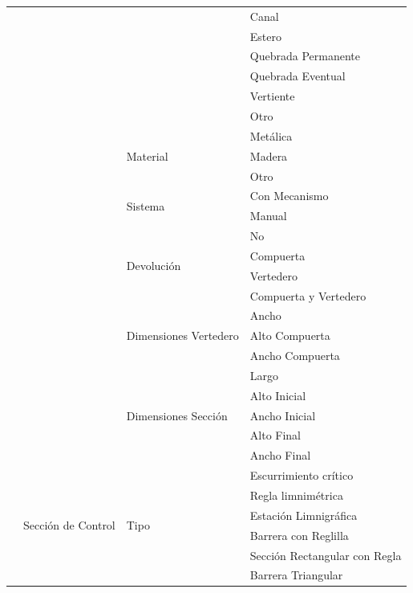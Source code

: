 \documentclass[]{article}
\begin{document}
\begin{longtable}{|p{3cm}|p{3.5cm}|p{3.5cm}|p{3.5cm}|}
    \cline{4-4}
    & & & Canal\\
    \cline{4-4}
    & & & Estero\\
    \cline{4-4}
    & & & Quebrada Permanente\\
    \cline{4-4}
    & & & Quebrada Eventual\\
    \cline{4-4}
    & & & Vertiente\\
    \cline{4-4}
    & & & Otro\\
    \cline{3-4}
    & & \multirow {3}{3.5cm}{Material} & Metálica\\
    \cline{4-4}
    & & & Madera\\
    \cline{4-4}
    & & & Otro\\
    \cline{3-4}
    & & \multirow {2}{3.5cm}{Sistema} & Con Mecanismo\\
    \cline{4-4}
    & & & Manual\\
    \cline{3-4}
    & & \multirow {4}{3.5cm}{Devolución} & No\\
    \cline{4-4}
    & & & Compuerta\\
    \cline{4-4}
    & & & Vertedero\\
    \cline{4-4}
    & & & Compuerta y Vertedero\\
    \cline{3-4}
    & & \multirow {3}{3.5cm}{Dimensiones Vertedero} & Ancho\\
    \cline{4-4}
    & & & Alto Compuerta\\
    \cline{4-4}
    & & & Ancho Compuerta\\
    \cline{3-4}
    & & \multirow {5}{3.5cm}{Dimensiones Sección} & Largo\\
    \cline{4-4}
    & & & Alto Inicial\\
    \cline{4-4}
    & & & Ancho Inicial\\
    \cline{4-4}
    & & & Alto Final\\
    \cline{4-4}
    & & & Ancho Final\\
    \cline{2-4} \pagebreak  
    & \multirow {17}{3.5cm}{Sección de Control} & \multirow {11}{3.5cm}{Tipo} &  Escurrimiento crítico\\
    \cline{4-4}
    & & & Regla limnimétrica\\
    \cline{4-4}
    & & & Estación Limnigráfica\\
    \cline{4-4}
    & & & Barrera con Reglilla\\
    \cline{4-4}
    & & & Sección Rectangular con Regla\\
    \cline{4-4}
    & & & Barrera Triangular\\

\end{longtable}
\end{document}
